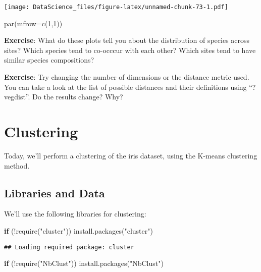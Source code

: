 \documentclass[
]{book}
\newenvironment{Shaded}{\begin{snugshade}}{\end{snugshade}}
\newcommand{\AttributeTok}[1]{\textcolor[rgb]{0.77,0.63,0.00}{#1}}
\newcommand{\ControlFlowTok}[1]{\textcolor[rgb]{0.13,0.29,0.53}{\textbf{#1}}}
\newcommand{\DecValTok}[1]{\textcolor[rgb]{0.00,0.00,0.81}{#1}}
\newcommand{\FunctionTok}[1]{\textcolor[rgb]{0.00,0.00,0.00}{#1}}
\newcommand{\NormalTok}[1]{#1}
\newcommand{\SpecialCharTok}[1]{\textcolor[rgb]{0.00,0.00,0.00}{#1}}
\newcommand{\StringTok}[1]{\textcolor[rgb]{0.31,0.60,0.02}{#1}}
\begin{document}
\texttt{[image: DataScience\_files/figure-latex/unnamed-chunk-73-1.pdf]}

\begin{Shaded}
\begin{Highlighting}[]
\FunctionTok{par}\NormalTok{(}\AttributeTok{mfrow=}\FunctionTok{c}\NormalTok{(}\DecValTok{1}\NormalTok{,}\DecValTok{1}\NormalTok{))}
\end{Highlighting}
\end{Shaded}

\textbf{Exercise}: What do these plots tell you about the distribution of species across sites? Which species tend to co-occcur with each other? Which sites tend to have similar species compositions?

\textbf{Exercise}: Try changing the number of dimensions or the distance metric used. You can take a look at the list of possible distances and their definitions using ``?vegdist''. Do the results change? Why?

\hypertarget{clustering}{%
\chapter{Clustering}\label{clustering}}

Today, we'll perform a clustering of the iris dataset, using the K-means clustering method.

\hypertarget{libraries-and-data-1}{%
\section{Libraries and Data}\label{libraries-and-data-1}}

We'll use the following libraries for clustering:

\begin{Shaded}
\begin{Highlighting}[]
\ControlFlowTok{if}\NormalTok{ (}\SpecialCharTok{!}\FunctionTok{require}\NormalTok{(}\StringTok{"cluster"}\NormalTok{)) }\FunctionTok{install.packages}\NormalTok{(}\StringTok{"cluster"}\NormalTok{)}
\end{Highlighting}
\end{Shaded}

\begin{verbatim}
## Loading required package: cluster
\end{verbatim}

\begin{Shaded}
\begin{Highlighting}[]
\ControlFlowTok{if}\NormalTok{ (}\SpecialCharTok{!}\FunctionTok{require}\NormalTok{(}\StringTok{"NbClust"}\NormalTok{)) }\FunctionTok{install.packages}\NormalTok{(}\StringTok{"NbClust"}\NormalTok{)}
\end{Highlighting}
\end{Shaded}
\end{document}
